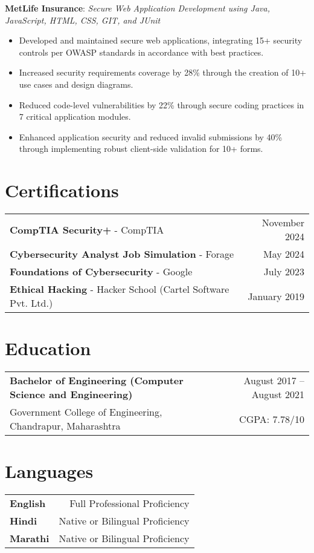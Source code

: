 \documentclass[a4paper,11pt]{article}
\newcommand{\sectiontitle}[1]{\section*{#1}}
\newcommand{\projectentry}[2]{
\raggedright\textbf{\textcolor{primary}{#1}}: \textit{#2} \\
}
\begin{document}
\projectentry{MetLife Insurance}{Secure Web Application Development using Java, JavaScript, HTML, CSS, GIT, and JUnit}
\begin{itemize}
\item Developed and maintained secure web applications, integrating 15+ security controls per OWASP standards in accordance with best practices.
\item Increased security requirements coverage by 28\% through the creation of 10+ use cases and design diagrams.
\item Reduced code-level vulnerabilities by 22\% through secure coding practices in 7 critical application modules.
\item Enhanced application security and reduced invalid submissions by 40\% through implementing robust client-side validation for 10+ forms.
\end{itemize}

\sectiontitle{Certifications}
\begin{tabularx}{\textwidth}{X r}
\textbf{CompTIA Security+} - CompTIA & November 2024 \\
\textbf{Cybersecurity Analyst Job Simulation} - Forage & May 2024 \\
\textbf{Foundations of Cybersecurity} - Google & July 2023 \\
\textbf{Ethical Hacking} - Hacker School (Cartel Software Pvt. Ltd.) & January 2019 \\
\end{tabularx}

\sectiontitle{Education}
\begin{tabularx}{\textwidth}{X r}
\textbf{Bachelor of Engineering (Computer Science and Engineering)} & August 2017 -- August 2021 \\
Government College of Engineering, Chandrapur, Maharashtra & CGPA: 7.78/10 \\
\end{tabularx}

\sectiontitle{Languages}
\begin{tabularx}{\textwidth}{X r}
\textbf{English} & Full Professional Proficiency \\
\textbf{Hindi} & Native or Bilingual Proficiency \\
\textbf{Marathi} & Native or Bilingual Proficiency \\
\end{tabularx}
\end{document}
